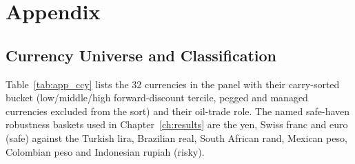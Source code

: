 
\chapter{Appendix}
\label{ch:appendix_a}

\section{Currency Universe and Classification}
\label{sec:app_classification}

Table~\ref{tab:app_ccy} lists the 32 currencies in the panel with their carry-sorted bucket
(low/middle/high forward-discount tercile, pegged and managed currencies excluded from the
sort) and their oil-trade role. The named safe-haven robustness baskets used in
Chapter~\ref{ch:results} are the yen, Swiss franc and euro (safe) against the Turkish
lira, Brazilian real, South African rand, Mexican peso, Colombian peso and Indonesian rupiah
(risky).

